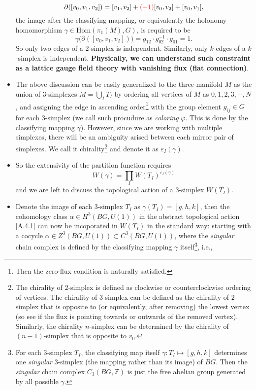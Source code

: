 \documentclass[10pt,nofootinbib,letterpaper]{revtex4}
\begin{document}
\begin{itemize}
			\begin{equation*}
				\partial([v_0,v_1,v_2])=[v_1,v_2]+{\color{red}(-1)}[v_0,v_2]+[v_0,v_1],
			\end{equation*}
			the image after the classifying mapping, or equivalently the holonomy homomorphism $\gamma\in\mathrm{Hom}(\pi_1(M),G)$, is required to be
			\begin{equation*}
				\gamma\bigg(\partial([v_0,v_1,v_2])\bigg)=g_{12}\cdot g_{02}^{-1}\cdot g_{01}=1.
			\end{equation*}
			So only two edges of a $2$-simplex is independent. Similarly, only $k$ edges of a $k$-simplex is independent. \textbf{Physically, we can understand such constraint as a lattice gauge field theory with vanishing flux (flat connection)}. 
			\item The above discussion can be easily generalized to the three-manifold $M$ as the union of $3$-simplexes $M=\bigcup_IT_I$ by ordering all vertices of $M$ as $0,1,2,3,\cdots,N$, and assigning the edge in ascending order\footnote{Then the zero-flux condition is naturally satisfied.} with the group element $g_{ij}\in G$ for each $3$-simplex (we call such procudure as \emph{coloring} $\varphi$. This is done by the classifying mapping $\gamma$). However, since we are working with multiple simplexes, there will be an ambiguity arised between each mirror pair of simplexes. We call it chirality\footnote{The chirality of $2$-simplex is defined as clockwise or counterclockwise ordering of vertices. The chirality of $3$-simplex can be defined as the chirality of $2$-simplex that is opposite to (or equivalently, after removing) the lowest vertex (so see if the flux is pointing towards or outwards of the removed vertex). Similarly, the chirality $n$-simplex can be determined by the chirality of $(n-1)$-simplex that is opposite to $v_0$.} and denote it as $\varepsilon_I(\gamma)$.
			\item So the extensivity of the partition function requires
			\begin{equation*}
				W(\gamma)=\prod_{I}W(T_I)^{\varepsilon_I(\gamma)}
			\end{equation*}
			and we are left to discuss the topological action of a $3$-simplex $W(T_I)$.
			\item Denote the image of each $3$-simplex $T_I$ as $\gamma(T_I)=[g,h,k]$, then the cohomology class $\alpha\in H^3(BG,U(1))$ in the abstract topological action \eqref{A.4.1} can now be incoporated in $W(T_I)$ in the standard way: starting with a cocycle $\alpha\in Z^3(BG,U(1))\subset C^3(BG,U(1))$, where the \emph{singular} chain complex is defined by the classifying mapping $\gamma$ itself\footnote{For each $3$-simplex $T_I$, the classifying map itself $\gamma:T_I\mapsto[g,h,k]$ determines one \emph{singular} $3$-simplex (the mapping rather than its image) of $BG$. Then the \emph{singular} chain complex $C_3(BG,\mathbb{Z})$ is just the free abelian group generated by all possible $\gamma$.}, i.e., 

\end{itemize}
\end{document}
